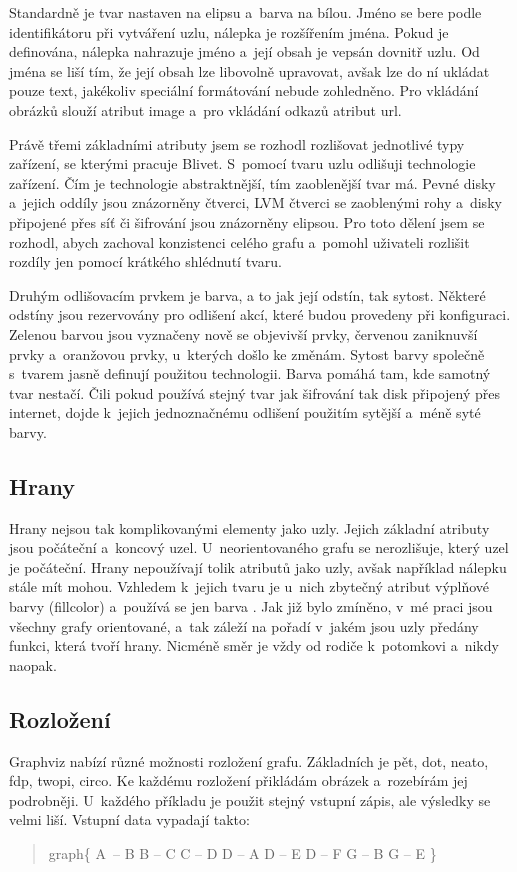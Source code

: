 \documentclass[color,table,oneside,nolot,nolof]{fithesis}
\begin{document}
	Standardně je tvar nastaven na elipsu a~barva
	na bílou. Jméno se bere podle identifikátoru při vytváření uzlu, nálepka je rozšířením jména. Pokud je definována, nálepka nahrazuje jméno a~její obsah je vepsán dovnitř uzlu. Od jména se liší 
	tím, že její obsah lze libovolně upravovat, avšak lze do ní ukládat pouze text, jakékoliv speciální formátování nebude zohledněno. Pro vkládání obrázků slouží atribut image a~pro vkládání
	odkazů atribut url.

	Právě třemi základními atributy jsem se rozhodl rozlišovat jednotlivé typy zařízení, se kterými pracuje Blivet. S~pomocí tvaru uzlu odlišuji technologie zařízení. Čím je technologie
	abstraktnější, tím zaoblenější tvar má. Pevné disky a~jejich oddíly jsou znázorněny čtverci, LVM čtverci se zaoblenými rohy a~disky připojené přes síť či šifrování jsou znázorněny elipsou.
	Pro toto dělení jsem se rozhodl, abych zachoval konzistenci celého grafu a~pomohl uživateli rozlišit rozdíly jen pomocí krátkého shlédnutí tvaru.

	Druhým odlišovacím prvkem je barva, a to jak její odstín, tak sytost. Některé odstíny jsou rezervovány pro odlišení akcí, které budou provedeny při konfiguraci. Zelenou barvou jsou vyznačeny
	nově se objevivší prvky, červenou zaniknuvší prvky a~oranžovou prvky, u~kterých došlo ke změnám. Sytost barvy společně s~tvarem jasně definují použitou technologii. Barva pomáhá tam, kde
	samotný tvar nestačí. Čili pokud používá stejný tvar jak šifrování tak disk připojený přes internet, dojde k~jejich jednoznačnému odlišení použitím sytější a~méně syté barvy.

\subsection{Hrany}
	Hrany nejsou tak komplikovanými elementy jako uzly. Jejich základní atributy jsou počáteční a~koncový uzel. U~neorientovaného grafu se nerozlišuje, který uzel je počáteční. Hrany 
	nepoužívají tolik atributů jako uzly, avšak například nálepku stále mít mohou. Vzhledem k~jejich tvaru je u~nich zbytečný atribut výplňové barvy (fillcolor) a~používá se jen barva 
	.
	Jak již bylo zmíněno, v~mé praci jsou všechny grafy orientované, a~tak záleží na pořadí v~jakém jsou uzly předány funkci, která tvoří hrany. Nicméně směr je vždy od rodiče k~potomkovi
	a~nikdy naopak.
	
\subsection{Rozložení}
	Graphviz nabízí různé možnosti rozložení grafu. Základních je pět, dot, neato, fdp, twopi, circo. Ke každému rozložení přikládám obrázek a~rozebírám jej 
	podrobněji. U~každého příkladu je použit stejný vstupní zápis, ale výsledky se velmi liší. Vstupní data vypadají takto:
	\begin{quotation}
	graph\{
		A~-- B
		B -- C
		C -- D
		D -- A
		D -- E
		D -- F
		G -- B
		G -- E
	\}
	\end{quotation}
\end{document}
